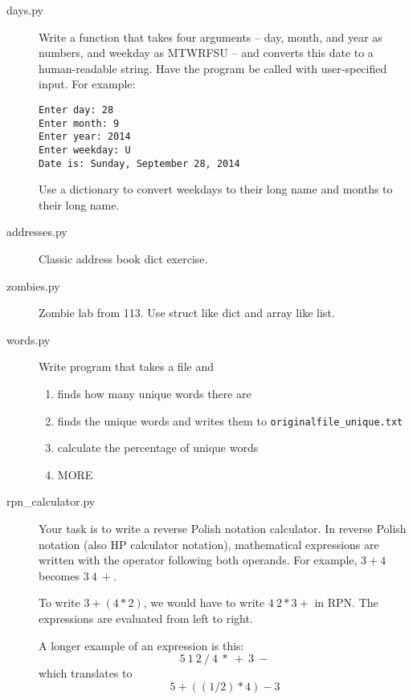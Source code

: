 \documentclass[11pt]{cselabheader}
\begin{document}
\begin{description}
  \item[days.py] Write a function that takes four arguments -- day, month, and
    year as numbers, and weekday as MTWRFSU -- and converts this date to a
    human-readable string. Have the program be called with user-specified
    input. For example:
    \begin{lstlisting}[style=bash]
Enter day: 28
Enter month: 9
Enter year: 2014
Enter weekday: U
Date is: Sunday, September 28, 2014
    \end{lstlisting}

    Use a dictionary to convert weekdays to their long name and months to their
    long name.

  \item[addresses.py] Classic address book dict exercise.

  \item[zombies.py] Zombie lab from 113. Use struct like dict and array like
    list.

  \item[words.py] Write program that takes a file and
    \begin{enumerate}
      \item finds how many unique words there are
      \item finds the unique words and writes them to
        \texttt{originalfile\_unique.txt}
      \item calculate the percentage of unique words
      \item MORE
    \end{enumerate}


  \item[rpn\_calculator.py] Your task is to write a reverse Polish notation
    calculator. In reverse Polish notation (also HP
    calculator notation), mathematical expressions are written with the operator
    following both operands. For example, $3 + 4$ becomes $3~4~+$.

    To write $3 + (4 * 2)$, we would have to write $4~2 * 3 +$ in RPN. The
    expressions are evaluated from left to right.

    A longer example of an expression is this: 
    \[ 5~1~2~/~4~*~+~3~- \]
    which translates to
    \[ 5 + ( (1 / 2) * 4 ) - 3 \]


\end{description}
\end{document}
